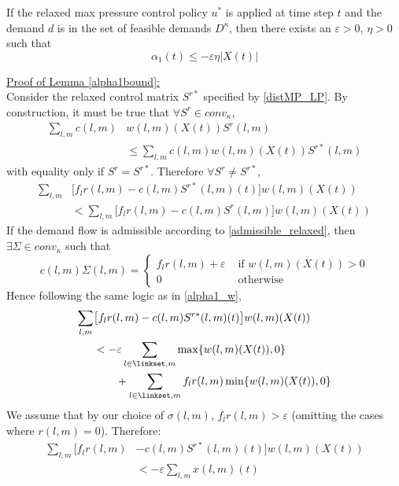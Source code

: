  \begin{Lem} \label{alpha1bound}
If the relaxed max pressure control policy $u^*$ is applied at time step $t$ and the demand $d$ is in the set of feasible demands $D^\kappa$, then there exists an $\varepsilon>0$, $\eta>0$ such that 
\begin{equation} 
\alpha_1(t)  \leq -\varepsilon \eta \big| X(t)\big| 
\end{equation}
\end{Lem}
\underline{Proof of Lemma \ref{alpha1bound}:} \\
Consider the relaxed control matrix $S^{r*}$ specified by \eqref{distMP_LP}. By construction, it must be true that $ \forall S^r \in conv_{\kappa}$, 
\begin{align} \nonumber
\sum_{l,m}c(l,m)& w(l,m)(X(t))S^r (l,m) \\
&\leq \sum_{l,m}c(l,m)w(l,m)(X(t))S^{r*}(l,m) 
\end{align}
with equality only if $S^r = S^{r*}$. 
Therefore $\forall S^r \neq S^{r*}$,
\begin{align} \nonumber
 \sum_{l,m}&\big[f_{l}r(l,m) - c(l,m)S^{r*}(l,m)(t)\big]w(l,m)(X(t)) \\
&<   \sum_{l,m}\big[f_{l}r(l,m) - c(l,m)S^r(l,m)\big]w(l,m)(X(t))
\end{align}
If the demand flow is admissible according to \eqref{admissible_relaxed}, then 
$\exists \Sigma \in conv_{\kappa}$ such that 
\begin{equation} \nonumber
c(l,m)\Sigma(l,m) = \begin{cases}
        f_{l}r(l,m) + \varepsilon & \text{ if } w(l,m)(X(t)) > 0 \\
        0 & \text{ otherwise}
    \end{cases}
\end{equation}
{\color{red} Hence following the same logic as in \eqref{alpha1_w}, }
\begin{align} \nonumber
 \sum_{l,m}&\big[f_{l}r(l,m) -  c(l,m)S^{r*}(l,m)(t)\big] w(l,m)(X(t))  \\ \nonumber
&  < -\varepsilon \sum_{l \in \linkset,m} \max\{w(l,m)(X(t)) ,0\} \\
&\qquad +  \sum_{l \in \linkset,m}  f_l r(l,m)  \min\{ w(l,m)(X(t)) ,0\}
\end{align}
We assume that by our choice of $\sigma(l,m)$, $f_{l}r(l,m) > \varepsilon$ (omitting the cases where $r(l,m) = 0$). Therefore:
\begin{align}\nonumber
\sum_{l,m}\big[ f_{l}r(l,m) & - c(l,m)S^{r*}(l,m)(t)\big]w(l,m)(X(t)) \\
&< -\varepsilon \displaystyle\sum_{l,m} x(l,m)(t)
\end{align}

